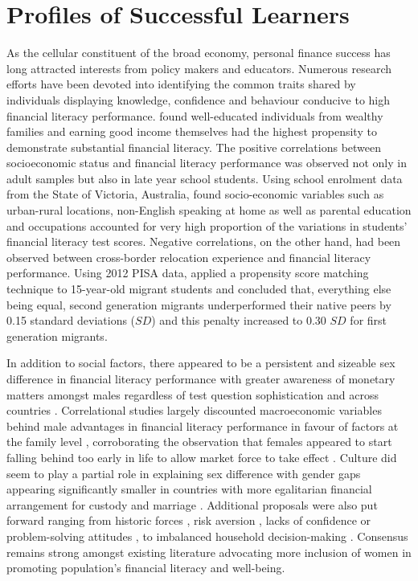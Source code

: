 \documentclass[a4paper,11pt,UKenglish,twoside,openright]{report}\usepackage[]{graphicx}\usepackage[]{color}
\begin{document}
\section{Profiles of Successful Learners}\label{sec:control}

As the cellular constituent of the broad economy, personal finance success has long attracted interests from policy makers and educators. Numerous research efforts have been devoted into identifying the common traits shared by individuals displaying knowledge, confidence and behaviour conducive to high financial literacy performance. \textcite{potrich:2015a} found well-educated individuals from wealthy families and earning good income themselves had the highest propensity to demonstrate substantial financial literacy. The positive correlations between socioeconomic status and financial literacy performance was observed not only in adult samples but also in late year school students. Using  school enrolment data from the State of Victoria, Australia, \textcite{ali:2016} found socio-economic variables such as urban-rural locations, non-English speaking at home as well as parental education and occupations accounted for very high proportion of the variations in students' financial literacy test scores. Negative correlations, on the other hand, had been observed between cross-border relocation experience and financial literacy performance. Using 2012 PISA data, \textcite{gramatki:2017} applied a propensity score matching technique to 15-year-old migrant students and concluded that, everything else being equal, second generation migrants underperformed their native peers by 0.15 standard deviations ($SD$) and this penalty increased to 0.30 $SD$ for first generation migrants.

In addition to social factors, there appeared to be a persistent and sizeable sex difference in financial literacy performance with greater awareness of monetary matters amongst males \parencite{atkinson:2011, lusardi:2010} regardless of test question sophistication \parencite{agnew:2015a, agnew:2015b} and across countries \parencite{bucherkoenen:2017}. Correlational studies largely discounted macroeconomic variables behind male advantages in financial literacy performance \parencite{chambers:2018} in favour of factors at the family level \parencite{chambers:2019}, corroborating the observation that females appeared to start falling behind too early in life \parencite{driva:2016} to allow market force to take effect \parencite{preston:2019}. Culture did seem to play a partial role in explaining sex difference \parencite{grohmann:2016} with gender gaps appearing significantly smaller in countries with more egalitarian financial arrangement for custody and marriage \parencite{hospido:2021}. Additional proposals were also put forward ranging from historic forces \parencite{bottazzi:2020}, risk aversion \parencite{chen:2018}, lacks of confidence \parencite{bucherkoenen:2021, danes:2007} or problem-solving attitudes \parencite{longobardi:2018}, to imbalanced household decision-making \parencite{fonseca:2012}. Consensus remains strong amongst existing literature advocating more inclusion of women in promoting population's financial literacy and well-being.
\end{document}
